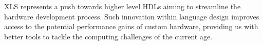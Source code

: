 XLS represents a push towards higher level HDLs aiming to streamline the hardware development process. Such innovation within language design improves access to the potential performance gains of custom hardware, providing us with better tools to tackle the computing challenges of the current age.







